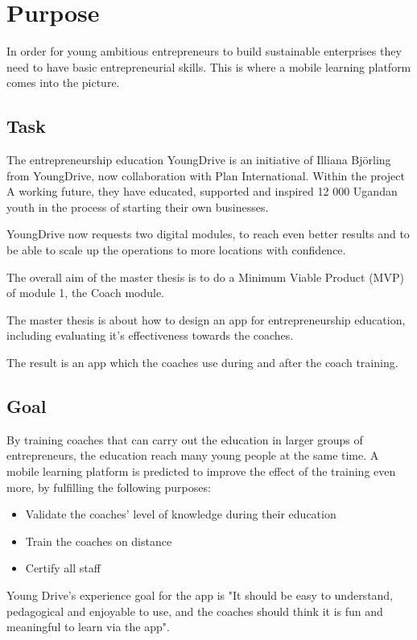 \section{Purpose}

In order for young ambitious entrepreneurs to build sustainable enterprises they need to have basic entrepreneurial skills. This is where a mobile learning platform comes into the picture.

\subsection{Task}
The entrepreneurship education YoungDrive is an initiative of Illiana Björling from YoungDrive, now collaboration with Plan International. Within the project A working future, they have educated, supported and inspired 12 000 Ugandan youth in the process of starting their own businesses. \citep{nissar}

YoungDrive now requests two digital modules, to reach even better results and to be able to scale up the operations to more locations with confidence.

The overall aim of the master thesis is to do a Minimum Viable Product (MVP) of module 1, the Coach module.

The master thesis is about how to design an app for entrepreneurship education, including evaluating it's effectiveness towards the coaches.

The result is an app which the coaches use during and after the coach training.

\subsection{Goal}

By training coaches that can carry out the education in larger groups of entrepreneurs, the education reach many young people at the same time. A mobile learning platform is predicted to improve the effect of the training even more, by fulfilling the following purposes:

\begin{itemize}
  \item Validate the coaches' level of knowledge during their education
    \item Train the coaches on distance
    \item Certify all staff
\end{itemize}

Young Drive's experience goal for the app is "It should be easy to understand, pedagogical and enjoyable to use, and the coaches should think it is fun and meaningful to learn via the app". \citep{youngdrive-masterthesis-idea}
